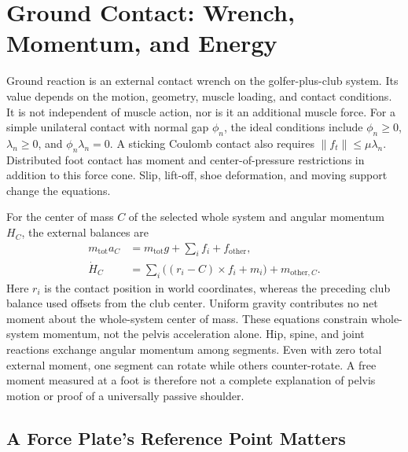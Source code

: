\section{Ground Contact: Wrench, Momentum, and Energy}
\label{sec:grf_lower_body}

Ground reaction is an external contact wrench on the golfer-plus-club system.
Its value depends on the motion, geometry, muscle loading, and contact conditions.
It is not independent of muscle action, nor is it an additional muscle force.
For a simple unilateral contact with normal gap $\phi_n$, the ideal conditions
include $\phi_n\ge0$, $\lambda_n\ge0$, and $\phi_n\lambda_n=0$. A sticking
Coulomb contact also requires $\|f_t\|\le\mu\lambda_n$. Distributed foot contact
has moment and center-of-pressure restrictions in addition to this force cone.
Slip, lift-off, shoe deformation, and moving support change the equations.

For the center of mass $C$ of the selected whole system and angular momentum
$H_C$, the external balances are
\begin{equation}
 \begin{aligned}
 m_{\mathrm{tot}}a_C &=m_{\mathrm{tot}}g+\sum_i f_i+f_{\mathrm{other}},\\
 \dot H_C &=\sum_i\big((r_i-C)\times f_i+m_i\big)
                  +m_{\mathrm{other},C}.
 \end{aligned}
 \label{eq:whole_body_momentum}
\end{equation}
Here $r_i$ is the contact position in world coordinates, whereas the preceding
club balance used offsets from the club center. Uniform gravity contributes no
net moment about the whole-system center of mass. These equations constrain
whole-system momentum, not the pelvis acceleration alone. Hip, spine, and joint
reactions exchange angular momentum among segments. Even with zero total external
moment, one segment can rotate while others counter-rotate. A free moment measured
at a foot is therefore not a complete explanation of pelvis motion or proof of a
universally passive shoulder.

\subsection{A Force Plate's Reference Point Matters}

